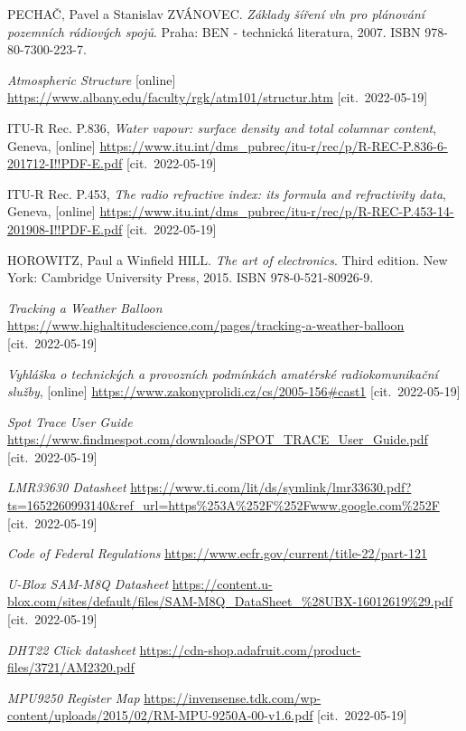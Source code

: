 \documentclass[twoside]{ctuthesis}
\theoremstyle{plain}
\theoremstyle{definition}
\theoremstyle{note}
\begin{document}
\appendix
\begin{thebibliography}{1}
	PECHAČ, Pavel a Stanislav ZVÁNOVEC. \textit{Základy šíření vln pro plánování pozemních rádiových spojů}. Praha: BEN - technická literatura, 2007. ISBN 978-80-7300-223-7.

	\textit{Atmospheric Structure} [online] \url{https://www.albany.edu/faculty/rgk/atm101/structur.htm} [cit.~2022-05-19]

	ITU-R Rec. P.836, \textit{Water vapour: surface density and total columnar content}, Geneva, [online] \url{https://www.itu.int/dms_pubrec/itu-r/rec/p/R-REC-P.836-6-201712-I!!PDF-E.pdf} [cit.~2022-05-19]

	ITU-R Rec. P.453, \textit{The radio refractive index: its formula and refractivity data}, Geneva, [online] \url{https://www.itu.int/dms_pubrec/itu-r/rec/p/R-REC-P.453-14-201908-I!!PDF-E.pdf} [cit.~2022-05-19]

	HOROWITZ, Paul a Winfield HILL. \textit{The art of electronics}. Third edition. New York: Cambridge University Press, 2015. ISBN 978-0-521-80926-9.

	\textit{Tracking a Weather Balloon}
    \url{https://www.highaltitudescience.com/pages/tracking-a-weather-balloon} [cit.~2022-05-19]

	\textit{Vyhláška o technických a provozních podmínkách amatérské radiokomunikační služby}, [online] \url{https://www.zakonyprolidi.cz/cs/2005-156#cast1} [cit.~2022-05-19]

	\textit{Spot Trace User Guide}
    \url{https://www.findmespot.com/downloads/SPOT_TRACE_User_Guide.pdf} [cit.~2022-05-19]

	\textit{LMR33630 Datasheet}
	\url{https://www.ti.com/lit/ds/symlink/lmr33630.pdf?ts=1652260993140&ref_url=https%253A%252F%252Fwww.google.com%252F} [cit.~2022-05-19]

	\textit{Code of Federal Regulations}
	\url{https://www.ecfr.gov/current/title-22/part-121}

	\textit{U-Blox SAM-M8Q Datasheet}
	\url{https://content.u-blox.com/sites/default/files/SAM-M8Q_DataSheet_%28UBX-16012619%29.pdf} [cit.~2022-05-19]

	\textit{DHT22 Click datasheet}
	\url{https://cdn-shop.adafruit.com/product-files/3721/AM2320.pdf}

	\textit{MPU9250 Register Map}
	\url{https://invensense.tdk.com/wp-content/uploads/2015/02/RM-MPU-9250A-00-v1.6.pdf} [cit.~2022-05-19]


\end{thebibliography}
\end{document}
